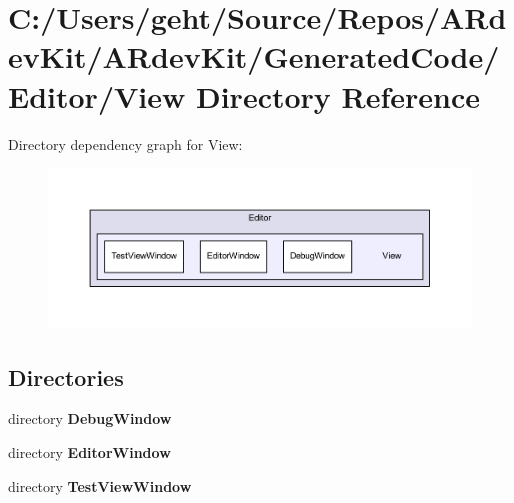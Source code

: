 \section{C\-:/\-Users/geht/\-Source/\-Repos/\-A\-Rdev\-Kit/\-A\-Rdev\-Kit/\-Generated\-Code/\-Editor/\-View Directory Reference}
\label{dir_2b876fe9fa3a2c1a1534914e7256c6d4}
Directory dependency graph for View\-:
\nopagebreak
\begin{figure}[H]
\begin{center}
\leavevmode
\includegraphics[width=350pt]{dir_2b876fe9fa3a2c1a1534914e7256c6d4_dep}
\end{center}
\end{figure}
\subsection*{Directories}
\begin{DoxyCompactItemize}
\item 
directory {\bf Debug\-Window}
\item 
directory {\bf Editor\-Window}
\item 
directory {\bf Test\-View\-Window}
\end{DoxyCompactItemize}
